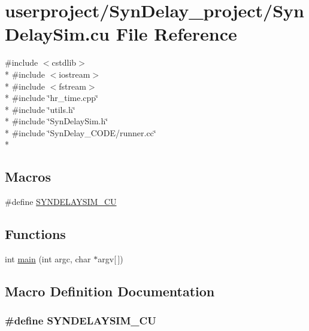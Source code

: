 \hypertarget{SynDelaySim_8cu}{\section{userproject/\+Syn\+Delay\+\_\+project/\+Syn\+Delay\+Sim.cu File Reference}
\label{SynDelaySim_8cu}
}
{\ttfamily \#include $<$cstdlib$>$}\\*
{\ttfamily \#include $<$iostream$>$}\\*
{\ttfamily \#include $<$fstream$>$}\\*
{\ttfamily \#include \char`\"{}hr\+\_\+time.\+cpp\char`\"{}}\\*
{\ttfamily \#include \char`\"{}utils.\+h\char`\"{}}\\*
{\ttfamily \#include \char`\"{}Syn\+Delay\+Sim.\+h\char`\"{}}\\*
{\ttfamily \#include \char`\"{}Syn\+Delay\+\_\+\+C\+O\+D\+E/runner.\+cc\char`\"{}}\\*
\subsection*{Macros}
\begin{DoxyCompactItemize}
\item 
\#define \hyperlink{SynDelaySim_8cu_afc25836801dff6f357f3ed3e9e955b3c}{S\+Y\+N\+D\+E\+L\+A\+Y\+S\+I\+M\+\_\+\+C\+U}
\end{DoxyCompactItemize}
\subsection*{Functions}
\begin{DoxyCompactItemize}
\item 
int \hyperlink{SynDelaySim_8cu_a0ddf1224851353fc92bfbff6f499fa97}{main} (int argc, char $\ast$argv\mbox{[}$\,$\mbox{]})
\end{DoxyCompactItemize}


\subsection{Macro Definition Documentation}
\hypertarget{SynDelaySim_8cu_afc25836801dff6f357f3ed3e9e955b3c}{
\subsubsection[{S\+Y\+N\+D\+E\+L\+A\+Y\+S\+I\+M\+\_\+\+C\+U}]{\setlength{\rightskip}{0pt plus 5cm}\#define S\+Y\+N\+D\+E\+L\+A\+Y\+S\+I\+M\+\_\+\+C\+U}}\label{SynDelaySim_8cu_afc25836801dff6f357f3ed3e9e955b3c}


